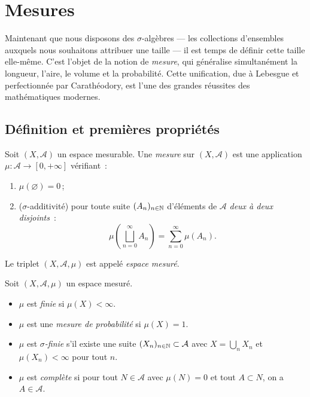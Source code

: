 \chapter{Mesures}
\label{ch:mesures}

Maintenant que nous disposons des $\sigma$-alg\`ebres --- les collections
d'ensembles auxquels nous souhaitons attribuer une taille --- il est temps
de d\'efinir cette \og taille\fg{} elle-m\^eme. C'est l'objet de la notion de
\emph{mesure}, qui g\'en\'eralise simultan\'ement la longueur, l'aire, le
volume et la probabilit\'e. Cette unification, due \`a Lebesgue et
perfectionn\'ee par Carath\'eodory, est l'une des grandes r\'eussites des
math\'ematiques modernes.

\section{D\'efinition et premi\`eres propri\'et\'es}

\begin{definition}[Mesure]
Soit $(X, \mathcal{A})$ un espace mesurable. Une \emph{mesure} sur
$(X, \mathcal{A})$ est une application $\mu : \mathcal{A} \to [0, +\infty]$
v\'erifiant~:
\begin{enumerate}
    \item[(i)] $\mu(\varnothing) = 0$\,;
    \item[(ii)] ($\sigma$-additivit\'e) pour toute suite $(A_n)_{n \in \mathbb{N}}$
    d'\'el\'ements de $\mathcal{A}$ \emph{deux \`a deux disjoints}~:
    \[
    \mu\!\left(\bigsqcup_{n=0}^{\infty} A_n\right) = \sum_{n=0}^{\infty} \mu(A_n).
    \]
\end{enumerate}
Le triplet $(X, \mathcal{A}, \mu)$ est appel\'e \emph{espace mesur\'e}.
\end{definition}

\begin{definition}
Soit $(X, \mathcal{A}, \mu)$ un espace mesur\'e.
\begin{itemize}
    \item $\mu$ est \emph{finie} si $\mu(X) < \infty$.
    \item $\mu$ est une \emph{mesure de probabilit\'e} si $\mu(X) = 1$.
    \item $\mu$ est \emph{$\sigma$-finie} s'il existe une suite $(X_n)_{n \in \mathbb{N}}
    \subset \mathcal{A}$ avec $X = \bigcup_n X_n$ et $\mu(X_n) < \infty$ pour
    tout $n$.
    \item $\mu$ est \emph{compl\`ete} si pour tout $N \in \mathcal{A}$ avec
    $\mu(N) = 0$ et tout $A \subset N$, on a $A \in \mathcal{A}$.
\end{itemize}
\end{definition}

